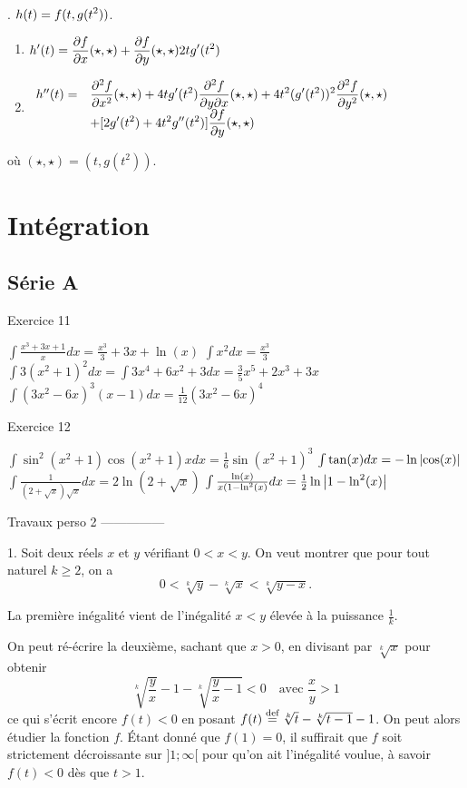 . $\dst{h(t)=f(t,g(t^2))}$.\\

\begin{enumerate}
\item $\dst{h'(t)=\dfdx(\star,\star)+\dfdy(\star,\star)2tg'(t^2)}$
\item $ \ba{rl} h''(t)=     &  \dst{ \ddfdx(\star,\star)+4tg'(t^2)\ddfdxy(\star,\star)+4t^2(g'(t^2))^2\ddfdy(\star,\star) }\\     		
				    & \dst{+[2g'(t^2)+4t^2g''(t^2)]\dfdy(\star,\star)}\ea$

\end{enumerate}
où $(\star,\star) = (t,g(t^2))$.




 \section{Intégration}
 \subsection{Série A}
 Exercice 11
 \begin{enumerate}
   \exr $\int \frac{x^3+3x+1}{x} d x = \frac{x^3}3 + 3x + \ln(x)$%
   \exr $\int x^2d x = \frac{x^3}3$%
   \exr $\int 3(x^2+1)^2 d x = \int 3 x^4 + 6 x^2 + 3 d x = \frac 35
   x^5 + 2 x^3 + 3x$%
   \exr $\int (3x^2 - 6x)^3 (x-1) d x = \frac1{12} (3x^2 - 6x)^4$
 \end{enumerate}

 Exercice 12
 \begin{enumerate}
   \exr $\int \sin^2(x^2+1) \cos(x^2+1) x d x = \frac16
   \sin(x^2+1)^3$%
   \exr $\int \tan(x) d x = -\ln\abs{\cos(x)}$%
   \exr $\int \frac{1}{(2+\sqrt{x})\sqrt x} d x= 2 \ln(2+\sqrt{x})$%
   \exr $\int \frac{\ln(x)}{x(1- \ln^2(x)} d x = \frac12
   \ln\abs{1-\ln^2(x)}$%
 \end{enumerate}



   Travaux perso 2 ---------------

   1. Soit deux réels $x$ et $y$ vérifiant $0 < x < y$. On veut montrer
   que pour tout naturel $k \geq 2$, on a
   \[0 < \sqrt[k]{y} - \sqrt[k]{x} < \sqrt[k]{y-x}.\]

   La première inégalité vient de l'inégalité $x < y$ élevée à la
   puissance $\frac1k$.

   On peut ré-écrire la deuxième, sachant que $x > 0$, en divisant par
   $\sqrt[k]{x}$ pour obtenir
   \[\sqrt[k]{\frac yx} - 1 - \sqrt[k]{\frac yx-1} < 0 \quad \text{
     avec $\frac xy > 1$}\] ce qui s'écrit encore $f(t) < 0$ en posant
   $f(t) \pardef \sqrt[k]t - \sqrt[k]{t-1} - 1$. On peut alors étudier
   la fonction $f$. Étant donné que $f(1) = 0$, il suffirait que $f$
   soit strictement décroissante sur $]1;\infty[$ pour qu'on ait
   l'inégalité voulue, à savoir $f(t) < 0$ dès que $t > 1$.

